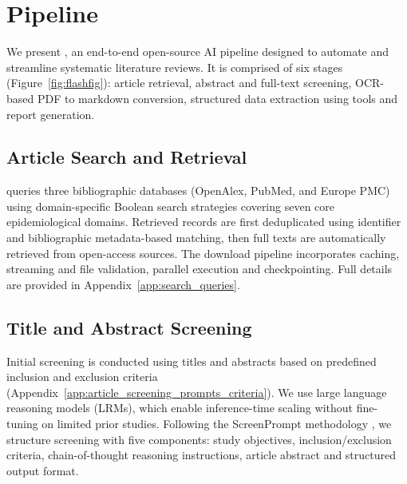\section{\name{} Pipeline}\label{sec:pipeline}
We present \name{}, an end-to-end open-source AI pipeline designed to automate and streamline systematic literature reviews. It is comprised of six stages (Figure~\ref{fig:flashfig}): article retrieval, abstract and full-text screening, OCR-based PDF to markdown conversion, structured data extraction using tools and report generation. 

\subsection{Article Search and Retrieval}\label{sec:search}
\name{} queries three bibliographic databases (OpenAlex, PubMed, and Europe PMC) using domain-specific Boolean search strategies covering seven core epidemiological domains. %
Retrieved records are first deduplicated using identifier and bibliographic metadata-based matching, then full texts are automatically retrieved from open-access sources. 
The download pipeline incorporates caching, streaming and file validation, parallel execution and checkpointing. Full details are provided in Appendix~\ref{app:search_queries}.


\subsection{Title and Abstract Screening}
Initial screening is conducted using titles and abstracts based on predefined inclusion and exclusion criteria (Appendix~\ref{app:article_screening_prompts_criteria}). We use large language reasoning models (LRMs), which enable inference-time scaling without fine-tuning on limited prior studies. Following the ScreenPrompt methodology \citep{ottoSRPromptPaper}, we structure screening with five components: study objectives, inclusion/exclusion criteria, chain-of-thought reasoning instructions, article abstract and structured output format. 

